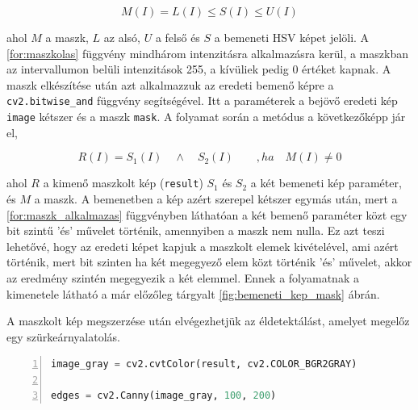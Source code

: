 \begin{equation}
    M(I) = L(I) \le S(I) \le U(I)
    \label{for:maszkolas}
\end{equation}

\par ahol $M$ a maszk, $L$ az alsó, $U$ a felső és $S$ a bemeneti HSV képet jelöli. A \ref{for:maszkolas} függvény mindhárom intenzitásra alkalmazásra kerül, a maszkban az intervallumon belüli intenzitások 255, a kívüliek pedig 0 értéket kapnak. A maszk elkészítése után azt alkalmazzuk az eredeti bemenő képre a \lstinline{cv2.bitwise_and} függvény \cite{opencv_docs} segítségével. Itt a paraméterek a bejövő eredeti kép \lstinline{image} kétszer és a maszk \lstinline{mask}.
\newline A folyamat során a metódus a következőképp jár el,

\begin{equation}
    R(I) = S_1(I)\quad \land\quad S_2(I)\qquad ,ha\quad M(I) \ne 0
    \label{for:maszk_alkalmazas}
\end{equation}

\par ahol $R$ a kimenő maszkolt kép (\lstinline{result}) $S_1$ és $S_2$ a két bemeneti kép paraméter, és $M$ a maszk. A bemenetben a kép azért szerepel kétszer egymás után, mert a \ref{for:maszk_alkalmazas} függvényben láthatóan a két bemenő paraméter közt egy bit szintű 'és' művelet történik, amennyiben a maszk nem nulla. Ez azt teszi lehetővé, hogy az eredeti képet kapjuk a maszkolt elemek kivételével, ami azért történik, mert bit szinten ha két megegyező elem közt történik 'és' művelet, akkor az eredmény szintén megegyezik a két elemmel. Ennek a folyamatnak a kimenetele látható a már előzőleg tárgyalt \ref{fig:bemeneti_kep_mask} ábrán.
\par A maszkolt kép megszerzése után elvégezhetjük az éldetektálást, amelyet megelőz egy szürkeárnyalatolás.

\vspace{2mm}
\hspace{-10mm}
\begin{minipage}{\linewidth}
\begin{lstlisting}[language=Python, numbers=left, caption={Szürkeárnyalatolás és éldetektálás.}, label={cod:gray_and_canny}]
image_gray = cv2.cvtColor(result, cv2.COLOR_BGR2GRAY)

edges = cv2.Canny(image_gray, 100, 200)
\end{lstlisting}
\end{minipage}

